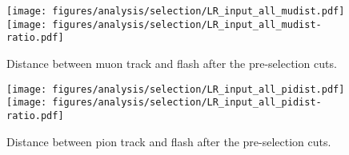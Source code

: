     \begin{figure}[ht]
      \centering
      \texttt{[image: figures/analysis/selection/LR\_input\_all\_mudist.pdf]} \\
      \texttt{[image: figures/analysis/selection/LR\_input\_all\_mudist-ratio.pdf]}
      \caption{Distance between muon track and flash after the pre-selection
        cuts.}
      \label{fig:lrmudist}
    \end{figure}
    \begin{figure}[ht]
      \centering
      \texttt{[image: figures/analysis/selection/LR\_input\_all\_pidist.pdf]} \\
      \texttt{[image: figures/analysis/selection/LR\_input\_all\_pidist-ratio.pdf]}
      \caption{Distance between pion track and flash after the pre-selection
        cuts.}
      \label{fig:lrpidist}
    \end{figure}

    \FloatBarrier

